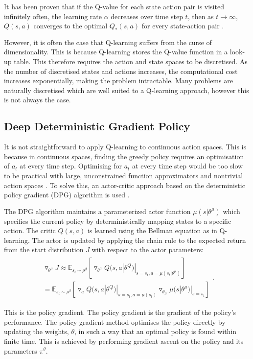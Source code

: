 It has been proven that if the Q-value for each state action pair is visited infinitely often, the learning rate $\alpha$ decreases over time step $t$, then as $t\rightarrow \infty$, $Q(s,a)$ converges to the optimal $Q_*(s,a)$ for every state-action pair \cite{Gay2007}.

However, it is often the case that Q-learning suffers from the curse of dimensionality. This is because Q-learning stores the Q-value function in a look-up table. This therefore requires the action and state spaces to be discretised. As the number of discretised states and actions increases, the computational cost increases exponentially, making the problem intractable. Many problems are naturally discretised which are well suited to a Q-learning approach, however this is not always the case. 

\subsection{Deep Deterministic Gradient Policy}


It is not straightforward to apply Q-learning to continuous action spaces. This is because in continuous spaces, finding the greedy policy requires an optimisation of $a_t$ at every time step. Optimising for $a_t$ at every time step would be too slow to be practical with large, unconstrained function approximators and nontrivial action spaces \cite{Hunt2016a}. To solve this, an actor-critic approach based on the deterministic policy gradient (DPG) algorithm is used \cite{Silver2014}.


The DPG algorithm maintains a parameterized actor function $\mu(s|\theta^\mu)$ which specifies the current policy by deterministically mapping states to a specific action. The critic $Q(s,a)$ is learned using the Bellman equation as in Q-learning. The actor is updated by applying the chain rule to the expected return from the start distribution $J$ with respect to the actor parameters:
\begin{align}
\begin{split}
\triangledown_{\theta^\mu}J\approx\mathbb{E}_{s_t\sim\rho^\beta}[\triangledown_{\theta^\mu}Q(s,a|\theta^Q)|_{s=s_t,a=\mu(s_t|\theta^\mu)}] \\
= \mathbb{E}_{s_t\sim\rho^\beta}[\triangledown_aQ(s,a|\theta^Q)|_{s=s_t,a=\mu(s_t)}\triangledown_{\theta_\mu}\mu(s|\theta^\mu)|_{s=s_t}]
\end{split}.
\end{align}

This is the policy gradient. The policy gradient is the gradient of the policy's performance. The policy gradient method optimises the policy directly by updating the weights, $\theta$, in such a way that an optimal policy is found within finite time. This is achieved by performing gradient ascent on the policy and its parameters $\pi^\theta$.

